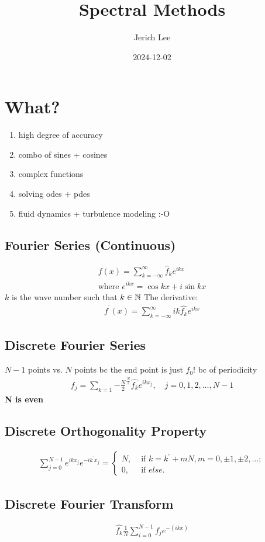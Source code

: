 \documentclass[12pt]{article}
\title{Spectral Methods}
\author{Jerich Lee}
\date{2024-12-02}
\theoremstyle{definition} %
\theoremstyle{plain} %
\begin{document}
\maketitle
\section{What?}
\begin{enumerate}
    \item high degree of accuracy
    \item combo of sines + cosines
    \item complex functions
    \item solving odes + pdes
    \item fluid dynamics + turbulence modeling :‑O
\end{enumerate}
\subsection{Fourier Series (Continuous)}
\begin{align}
    f(x)= \sum_{k=-\infty}^{\infty} \hat{f}_{k}e^{ikx}  \\[10pt] 
    \text{where } e^{ikx} = \cos kx + i\sin kx 
\end{align}
$k$ is the wave number such that $k\in \mathbb{\MakeUppercase{n}} $
The derivative:
\begin{align}
    f^{^\prime}(x)= \sum_{k=-\infty }^{\infty }ik \hat{f_k}e^{ikx} 
\end{align}
\subsection{Discrete Fourier Series}
$N-1$ points vs. $N$ points bc the end point is just $f_0$! bc of periodicity 
\begin{align}
    f_j = \sum_{k=1}{-\frac{N}{2}}^{\frac{N}{2}} \hat{f_k} e^{ikx_j}, \quad j=0,1,2, \ldots , N-1 
\end{align}
\textbf{N is even}
\subsection{Discrete Orthogonality Property}
\begin{align}
    \sum_{j=0}^{N-1} e^{ikx_j}e^{-ik^{^\prime}x_j}= 
    \begin{cases}
        N, &\text{ if } k=k^\prime +mN, m=0,\pm 1, \pm 2, \ldots   ;\\
        0, &\text{ if } else .
    \end{cases}
\end{align}
\subsection{Discrete Fourier Transform}
\begin{align}
    \hat{f_k} \frac{1}{N}\sum_{i=0}^{N-1} f_j e^{-\left( ikx \right) }
\end{align}
\end{document}
